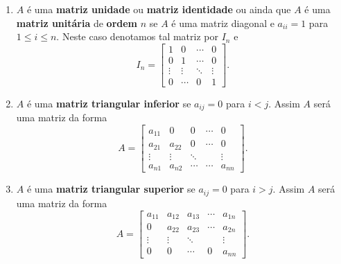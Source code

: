 \begin{definicao}
\begin{enumerate}
        \item $A$ é uma \textbf{matriz unidade} ou \textbf{matriz identidade} ou ainda que $A$ é uma \textbf{matriz unitária} de
            \textbf{ordem} $n$ se $A$ é uma matriz diagonal e $a_{ii} = 1$ para $1 \le i \le n$. Neste caso denotamos tal matriz por $I_n$ e
        \[
            I_n = \begin{bmatrix}
                1 & 0 & \cdots & 0\\
                0 & 1 & \cdots & 0\\
                \vdots & \vdots & \ddots & \vdots\\
                0 & \cdots & 0 & 1
            \end{bmatrix}.
        \]
    \item $A$ é uma \textbf{matriz triangular inferior} se $a_{ij} = 0$ para $i < j$. Assim $A$ será uma matriz da forma
    \[
        A = \begin{bmatrix}
                a_{11} & 0 & 0 & \cdots & 0\\
                a_{21} & a_{22} & 0 & \cdots & 0\\
                \vdots & \vdots & \ddots & & \vdots\\
                a_{n1} & a_{n2} & \cdots & \cdots &  a_{nn}
        \end{bmatrix}.
    \]
    \item $A$ é uma \textbf{matriz triangular superior} se $a_{ij} = 0$ para $i > j$. Assim $A$ será uma matriz da forma
    \[
        A = \begin{bmatrix}
                a_{11} & a_{12} & a_{13} & \cdots & a_{1n}\\
                0 & a_{22} & a_{23} & \cdots & a_{2n}\\
                \vdots & \vdots & \ddots & & \vdots\\
                0 & 0 & \cdots & 0 &  a_{nn}
        \end{bmatrix}.
    \]
    \end{enumerate}
\end{definicao}

